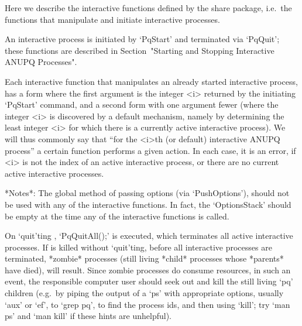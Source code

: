 

Here we describe the interactive functions defined by the {\ANUPQ}  share
package, i.e.~the functions  that  manipulate  and  initiate  interactive
{\ANUPQ} processes.

An  interactive  {\ANUPQ}  process  is  initiated  by   `PqStart'   and
terminated  via  `PqQuit';   these   functions   are   described   in
Section~"Starting and Stopping Interactive ANUPQ Processes".

Each interactive {\ANUPQ} function that manipulates  an  already  started
interactive {\ANUPQ} process, has a form where the first argument is  the
integer <i> returned by the initiating `PqStart' command,  and  a  second
form with one argument fewer (where the integer <i> is  discovered  by  a
default mechanism, namely by determining the least integer <i> for  which
there is a currently active interactive {\ANUPQ} process). We  will  thus
commonly say that  ``for  the  <i>th  (or  default)  interactive  {ANUPQ}
process'' a certain function performs a given action. In each case, it is
an error, if <i> is not the index of an active  interactive  process,  or
there are no current active interactive processes.

*Notes*: 
The global method of passing options (via `PushOptions'), should  not  be
used with any of the interactive functions. In fact,  the  `OptionsStack'
should be empty at the time any of the interactive functions is called.

On `quit'ting {\GAP}, `PqQuitAll();' is executed,  which  terminates  all
active interactive  {\ANUPQ}  processes.  If  {\GAP}  is  killed  without
`quit'ting, before all interactive  {\ANUPQ}  processes  are  terminated,
*zombie* processes (still living *child* processes whose  *parents*  have
died), will result. Since zombie processes do consume resources, in  such
an event, the responsible computer user should  seek  out  and  kill  the
still living `pq' children (e.g.~by piping the  output  of  a  `ps'  with
appropriate options, usually `aux' or `ef', to `grep  pq',  to  find  the
process ids, and then using `kill'; try `man ps' and `man kill' if  these
hints are unhelpful).

